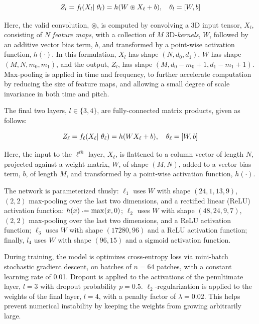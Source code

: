 \documentclass{article}
\begin{document}
\begin{equation}
\label{eq:convlayer}
\small
Z_l = f_l(X_l \given \theta_l) = h(W \circledast X_\ell + b), \quad \theta_l = [W, b]
\end{equation}

\noindent Here, the valid convolution, $\circledast$, is computed by convolving a 3D input tensor, $X_l$, consisting of $N$ \emph{feature maps}, with a collection of $M$ 3D-\emph{kernels}, $W$, followed by an additive vector bias term, $b$, and transformed by a point-wise activation function, $h(\cdot)$.
In this formulation, $X_l$ has shape $(N, d_0, d_1)$, $W$ has shape $(M, N, m_0, m_1)$, and the output, $Z_l$, has shape $(M, d_0-m_0+1, d_1-m_1+1)$.
Max-pooling is applied in time and frequency, to further accelerate computation by reducing the size of feature maps, and allowing a small degree of scale invariance in both time and pitch.

The final two layers, $l \in \{3, 4\}$, are fully-connected matrix products, given as follows:

\begin{equation}
\label{eq:fclayer}
Z_\ell = f_\ell(X_\ell |~ \theta_\ell) = h( WX_\ell + b), \quad \theta_\ell = [W, b]
\end{equation}

\noindent Here, the input to the $\ell^{th}$ layer, $X_\ell$, is flattened to a column vector of length $N$, projected against a weight matrix, $W$, of shape $(M, N)$, added to a vector bias term, $b$, of length $M$, and transformed by a point-wise activation function, $h(\cdot)$.

The network is parameterized thusly:
$\ell_1$ uses $W$ with shape $(24, 1, 13, 9)$, $(2, 2)$ max-pooling over the last two
dimensions, and a rectified linear (ReLU) activation function: $h(x) \defeq \max(x, 0)$;
$\ell_2$ uses $W$ with shape $(48, 24, 9, 7)$, $(2, 2)$ max-pooling over the last two dimensions, and a ReLU activation function;
$\ell_3$ uses $W$ with shape $(17280, 96)$ and a ReLU activation function;
finally, $l_4$ uses $W$ with shape $(96, 15)$ and a sigmoid activation function.

During training, the model is optimizes cross-entropy loss via mini-batch stochastic
gradient descent, on batches of $n=64$ patches, with a constant learning rate of 0.01.
Dropout is applied to the activations of the penultimate layer, $l=3$ with dropout
probability $p=0.5$.
$\ell_2$-regularization is applied to the weights of the final layer, $l=4$, with a
penalty factor of $\lambda=0.02$. This helps prevent numerical instability by keeping
the weights from growing arbitrarily large.
\end{document}
